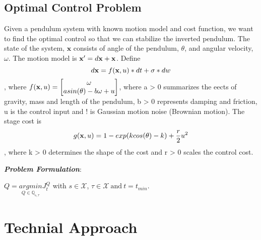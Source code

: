 \documentclass[letterpaper, 10 pt, conference]{ieeeconf}  %
\begin{document}
\subsection{Optimal Control Problem}
Given a pendulum system with known motion model and cost function, we want to find the optimal control so that we can stabilize the inverted pendulum. The state of the system, $\mathbf{x}$ consists of angle of the pendulum, $\theta$, and angular velocity, $\omega$. The motion model is $\mathbf{x}' = d\mathbf{x} + \mathbf{x}$. 
Define 
\begin{equation}
d\mathbf{x} = f(\mathbf{x}, u) * dt + \sigma * dw
\end{equation}, where $f(\mathbf{x}, u) = \begin{bmatrix}
\omega \\ 
asin(\theta) - b\omega + u
\end{bmatrix}$, where a > 0 summarizes the eects of gravity, mass and length of the pendulum, b > 0 represents damping and friction, u is the control input and ! is Gaussian motion noise (Brownian motion). The stage cost is 
\begin{equation}
g(\mathbf{x}, u) = 1 - exp(kcos(\theta) - k) + \frac{r}{2}u^2
\end{equation}, where k > 0 determines the shape of the cost and r > 0 scales the control cost.

\textbf{\textit{Problem Formulation}}: 

\begin{math}
Q = \underset{Q \in \mathbb{Q_{s,\tau}}}{argmin}J^Q_t
\end{math} with $s\in \mathcal{X}$, $\tau \in \mathcal{X} \ \text{and} \ t = t_{min}$.



\section{Technial Approach}
\end{document}
